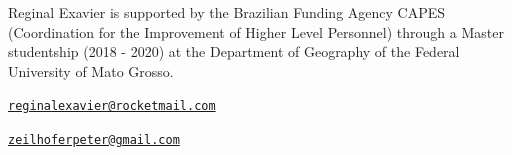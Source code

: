 Reginal Exavier is supported by the Brazilian Funding Agency CAPES
(Coordination for the Improvement of Higher Level Personnel) through a
Master studentship (2018 - 2020) at the Department of Geography of the
Federal University of Mato Grosso.




\address{%
Reginal Exavier\\
Department of Geography\\
Federal University of Mato Grosso\\ Avenida Fernando Corrêa da Costa, 2367 -- Boa Esperança, Cuiabá -- MT,
78060-900\\
}
\href{mailto:reginalexavier@rocketmail.com}{\nolinkurl{reginalexavier@rocketmail.com}}

\address{%
Peter Zeilhofer\\
Department of Geography\\
Federal University of Mato Grosso\\ Avenida Fernando Corrêa da Costa, 2367 -- Boa Esperança, Cuiabá -- MT,
78060-900\\
}
\href{mailto:zeilhoferpeter@gmail.com}{\nolinkurl{zeilhoferpeter@gmail.com}}

